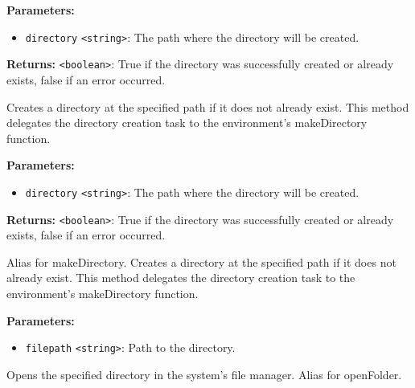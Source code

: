 \documentclass[12pt,a4paper]{article}
\begin{document}
\noindent \textbf{Parameters:}
\begin{itemize}
  \item \texttt{directory} \texttt{<string>}: The path where the directory will be created.
\end{itemize}

\noindent \textbf{Returns:} \texttt{<boolean>}: True if the directory was successfully created or already exists, false if an error occurred.

\noindent Creates a directory at the specified path if it does not already exist.
This method delegates the directory creation task to the environment's makeDirectory function.

\vspace{5mm}
\noindent {}


\noindent \textbf{Parameters:}
\begin{itemize}
  \item \texttt{directory} \texttt{<string>}: The path where the directory will be created.
\end{itemize}

\noindent \textbf{Returns:} \texttt{<boolean>}: True if the directory was successfully created or already exists, false if an error occurred.

\noindent Alias for makeDirectory. Creates a directory at the specified path if it does not already exist.
This method delegates the directory creation task to the environment's makeDirectory function.

\vspace{5mm}
\noindent {}


\noindent \textbf{Parameters:}
\begin{itemize}
  \item \texttt{filepath} \texttt{<string>}: Path to the directory.
\end{itemize}

\noindent Opens the specified directory in the system's file manager. Alias for \textasciigrave{}openFolder\textasciigrave{}.

\vspace{5mm}
\noindent {}
\end{document}
